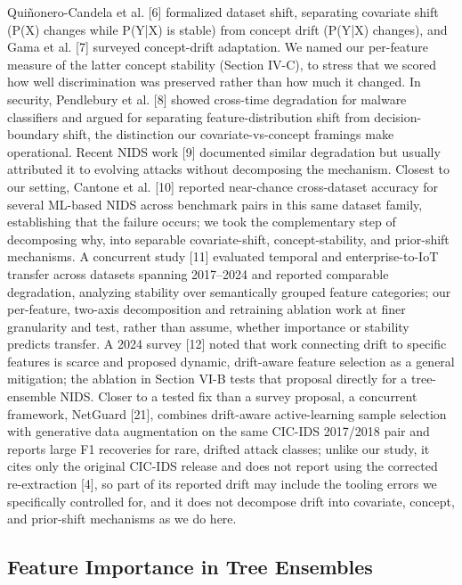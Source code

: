 \documentclass[conference]{IEEEtran}
\begin{document}
Quiñonero-Candela et al. [6] formalized dataset shift, separating covariate shift (P(X) changes while P(Y|X) is stable) from concept drift (P(Y|X) changes), and Gama et al. [7] surveyed concept-drift adaptation. We named our per-feature measure of the latter concept stability (Section IV-C), to stress that we scored how well discrimination was preserved rather than how much it changed. In security, Pendlebury et al. [8] showed cross-time degradation for malware classifiers and argued for separating feature-distribution shift from decision-boundary shift, the distinction our covariate-vs-concept framings make operational. Recent NIDS work [9] documented similar degradation but usually attributed it to evolving attacks without decomposing the mechanism. Closest to our setting, Cantone et al. [10] reported near-chance cross-dataset accuracy for several ML-based NIDS across benchmark pairs in this same dataset family, establishing that the failure occurs; we took the complementary step of decomposing why, into separable covariate-shift, concept-stability, and prior-shift mechanisms. A concurrent study [11] evaluated temporal and enterprise-to-IoT transfer across datasets spanning 2017--2024 and reported comparable degradation, analyzing stability over semantically grouped feature categories; our per-feature, two-axis decomposition and retraining ablation work at finer granularity and test, rather than assume, whether importance or stability predicts transfer. A 2024 survey [12] noted that work connecting drift to specific features is scarce and proposed dynamic, drift-aware feature selection as a general mitigation; the ablation in Section VI-B tests that proposal directly for a tree-ensemble NIDS. Closer to a tested fix than a survey proposal, a concurrent framework, NetGuard [21], combines drift-aware active-learning sample selection with generative data augmentation on the same CIC-IDS 2017/2018 pair and reports large F1 recoveries for rare, drifted attack classes; unlike our study, it cites only the original CIC-IDS release and does not report using the corrected re-extraction [4], so part of its reported drift may include the tooling errors we specifically controlled for, and it does not decompose drift into covariate, concept, and prior-shift mechanisms as we do here.
\par\medskip

\subsection{Feature Importance in Tree Ensembles}
\end{document}
